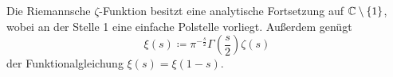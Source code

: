 \begin{frame}
    \begin{lemma}
        Die Riemannsche $\zeta$-Funktion besitzt eine analytische Fortsetzung auf $\mathbb{C}\setminus\{1\}$, wobei an der Stelle 1 eine einfache Polstelle vorliegt. Außerdem genügt 
        \[\xi(s) \coloneqq \pi^{-\frac{s}{2}} \Gamma\left(\frac{s}{2}\right)\zeta(s)\] der Funktionalgleichung $\xi(s) = \xi(1-s)$.
    \end{lemma}
\end{frame}